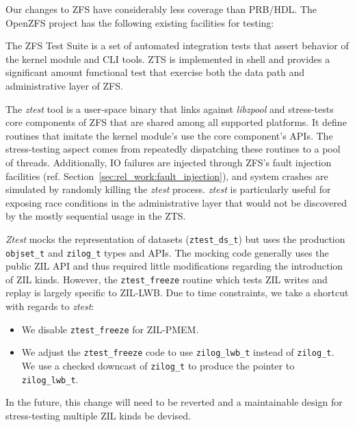 \documentclass[12pt,a4paper,twoside]{book}
\begin{document}
Our changes to ZFS have considerably less coverage than PRB/HDL.
The OpenZFS project has the following existing facilities for testing:
\begin{description}[noitemsep]
    \item[ZFS Test Suite (ZTS)] The ZFS Test Suite is a set of automated integration tests that assert behavior of the kernel module and CLI tools.
        ZTS is implemented in shell and provides a significant amount functional test that exercise both the data path and administrative layer of ZFS.
    \item[ztest] The \textit{ztest} tool is a user-space binary that links against \textit{libzpool} and stress-tests core components of ZFS that are shared among all supported platforms.
        It define routines that imitate the kernel module's use the core component's APIs.
        The stress-testing aspect comes from repeatedly dispatching these routines to a pool of threads.
        Additionally, IO failures are injected through ZFS's fault injection facilities (ref. Section~\ref{sec:rel_work:fault_injection}), and system crashes are simulated by randomly killing the \textit{ztest} process.
        \textit{ztest} is particularly useful for exposing race conditions in the administrative layer that would not be discovered by the mostly sequential usage in the ZTS.
\end{description}

\textit{Ztest} mocks the representation of datasets (\lstinline{ztest_ds_t}) but uses the production \lstinline{objset_t} and \lstinline{zilog_t} types and APIs.
The mocking code generally uses the public ZIL API and thus required little modifications regarding the introduction of ZIL kinds.
However, the \lstinline{ztest_freeze} routine which tests ZIL writes and replay is largely specific to ZIL-LWB.
Due to time constraints, we take a shortcut with regards to \textit{ztest}:
\begin{itemize}[noitemsep]
    \item We disable \lstinline{ztest_freeze} for ZIL-PMEM.
    \item We adjust the \lstinline{ztest_freeze} code to use \lstinline{zilog_lwb_t} instead of \lstinline{zilog_t}.
        We use a checked downcast of \lstinline{zilog_t} to produce the pointer to \lstinline{zilog_lwb_t}.
\end{itemize}
In the future, this change will need to be reverted and a maintainable design for stress-testing multiple ZIL kinds be devised.
\end{document}
